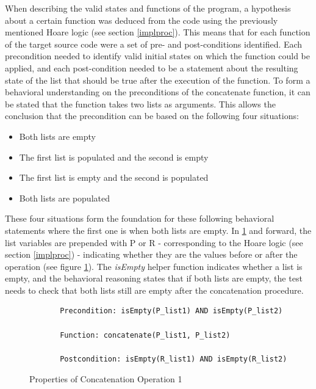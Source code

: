 When describing the valid states and functions of the program, a hypothesis about a certain function was deduced from the code using the previously mentioned Hoare logic (see section \ref{implproc}). This means that for each function of the target source code were a set of pre- and post-conditions identified. Each precondition needed to identify valid initial states on which the function could be applied, and each post-condition needed to be a statement about the resulting state of the list that should be true after the execution of the function. To form a behavioral understanding on the preconditions of the concatenate function, it can be stated that the function takes two lists as arguments. This allows the conclusion that the precondition can be based on the following four situations:

\begin{itemize}
  \item Both lists are empty
  \item The first list is populated and the second is empty
  \item The first list is empty and the second is populated
  \item Both lists are populated
\end{itemize}

These four situations form the foundation for these following behavioral statements where the first one is when both lists are empty. In \ref{fig:prop1} and forward, the list variables are prepended with P or R - corresponding to the Hoare logic (see section \ref{implproc}) - indicating whether they are the values before or after the operation (see figure \ref{fig:prop1}). The \textit{isEmpty} helper function indicates whether a list is empty, and the behavioral reasoning states that if both lists are empty, the test needs to check that both lists still are empty after the concatenation procedure. 

\begin{figure}[H]
 \vspace{12pt}
\begin{verbatim}
       Precondition: isEmpty(P_list1) AND isEmpty(P_list2)
    
       Function: concatenate(P_list1, P_list2)
    
       Postcondition: isEmpty(R_list1) AND isEmpty(R_list2)
\end{verbatim}
    \caption{Properties of Concatenation Operation 1}
    \label{fig:prop1}
\end{figure}


